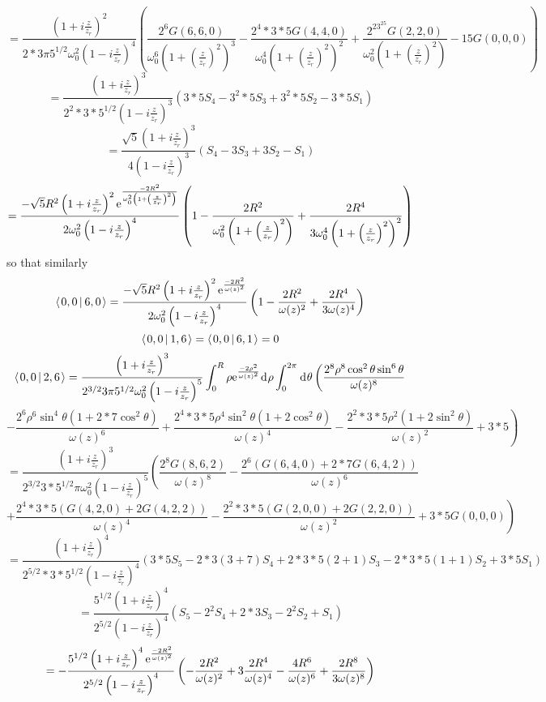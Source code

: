 \documentclass[11pt]{amsart}
\makeatletter
\newcommand{\e}{{\rm e}}				%
\newcommand{\msp}[1]{\mspace{#1mu}}		%
\newcommand{\0}{\varnothing}		%
\newcommand{\dd}{\msp{1} {\rm{d}} \msp{1}}	%
\newcommand{\brac}[2]{\left\langle\msp{2} #1\left\lvert \msp{3.5} #2 \right.\right\rangle}	%
\newcommand{\1}{!}
\newcommand{\2}{@}
\newcommand{\3}{\#}
\newcommand{\4}{\$}
\newcommand{\5}{\%}
\newcommand{\6}{$^\wedge$}
\newcommand{\7}{\&}
\newcommand{\8}{*}
\newcommand{\9}{(}
\makeatother
\begin{document}
\[
=\frac{\left(1+i\frac{z}{z_r}\right)^2}{2*3\pi5^{1/2}\omega_0^2\left(1-i\frac{z}{z_r}\right)^4}\left(\frac{2^6 G(6,6,0)}{\omega_0^6\left(1+\left(\frac{z}{z_r}\right)^2\right)^3}-\frac{2^4*3*5G(4,4,0)}{\omega_0^4\left(1+\left(\frac{z}{z_r}\right)^2\right)^2}+\frac{2^23^25G(2,2,0)}{\omega_0^2\left(1+\left(\frac{z}{z_r}\right)^2\right)}-15G(0,0,0)\right)
\]
\[
=\frac{\left(1+i\frac{z}{z_r}\right)^3}{2^2*3*5^{1/2}\left(1-i\frac{z}{z_r}\right)^3}\left(3*5S_4-3^2*5S_3+3^2*5S_2-3*5S_1\right)
\]
\[
=\frac{\sqrt{5}\left(1+i\frac{z}{z_r}\right)^3}{4\left(1-i\frac{z}{z_r}\right)^3}\left(S_4-3S_3+3S_2-S_1\right)
\]
\[
=\frac{-\sqrt{5}R^2\left(1+i\frac{z}{z_r}\right)^2\e^{\frac{-2R^2}{\omega_0^2\left(1+\left(\frac{z}{z_r}\right)^2\right)}}}{2\omega_0^2\left(1-i\frac{z}{z_r}\right)^4}\left(1-\frac{2R^2}{\omega_0^2\left(1+\left(\frac{z}{z_r}\right)^2\right)}+\frac{2R^4}{3\omega_0^4\left(1+\left(\frac{z}{z_r}\right)^2\right)^2}\right)
\]
so that similarly
\[
\brac{0,0}{6,0} = \frac{-\sqrt{5}R^2\left(1+i\frac{z}{z_r}\right)^2\e^{\frac{-2R^2}{\omega(z)^2}}}{2\omega_0^2\left(1-i\frac{z}{z_r}\right)^4}\left(1-\frac{2R^2}{\omega(z)^2}+\frac{2R^4}{3\omega(z)^4}\right)
\]
\[
\brac{0,0}{1,6} = \brac{0,0}{6,1} = 0
\]\newpage
\[
\brac{0,0}{2,6} = \frac{\left(1+i\frac{z}{z_r}\right)^3}{2^{3/2}3\pi5^{1/2}\omega_0^2\left(1-i\frac{z}{z_r}\right)^5}\int_0^R\rho \e^{\frac{-2\rho^2}{\omega(z)^2}}\dd \rho\int_0^{2\pi}\dd \theta\left(\frac{2^8\rho^8\cos^2\theta\sin^6\theta}{\omega(z)^8}\right.
\]
\[
\left.-\frac{2^6\rho^6\sin^4\theta\left(1+2*7\cos^2\theta\right)}{\omega(z)^6}+\frac{2^4*3*5\rho^4\sin^2\theta\left(1+2\cos^2\theta\right)}{\omega(z)^4}-\frac{2^2*3*5\rho^2\left(1+2\sin^2\theta\right)}{\omega(z)^2}+3*5\right)
\]
\[
= \frac{\left(1+i\frac{z}{z_r}\right)^3}{2^{3/2}3*5^{1/2}\pi\omega_0^2\left(1-i\frac{z}{z_r}\right)^5}\left(\frac{2^8G(8,6,2)}{\omega(z)^8}-\frac{2^6\left(G(6,4,0)+2*7G(6,4,2)\right)}{\omega(z)^6}\right.
\]
\[
\left.+\frac{2^4*3*5\left(G(4,2,0)+2G(4,2,2)\right)}{\omega(z)^4}-\frac{2^2*3*5\left(G(2,0,0)+2G(2,2,0)\right)}{\omega(z)^2}+3*5G(0,0,0)\right)
\]
\[
=\frac{\left(1+i\frac{z}{z_r}\right)^4}{2^{5/2}*3*5^{1/2}\left(1-i\frac{z}{z_r}\right)^4}\left(3*5S_5-2*3\left(3+7\right)S_4+2*3*5\left(2+1\right)S_3-2*3*5\left(1+1\right)S_2+3*5S_1\right)
\]
\[
=\frac{5^{1/2}\left(1+i\frac{z}{z_r}\right)^4}{2^{5/2}\left(1-i\frac{z}{z_r}\right)^4}\left(S_5-2^2S_4+2*3S_3-2^2S_2+S_1\right)
\]
\[
=-\frac{5^{1/2}\left(1+i\frac{z}{z_r}\right)^4\e^{\frac{-2R^2}{\omega(z)^2}}}{2^{5/2}\left(1-i\frac{z}{z_r}\right)^4}\left(-\frac{2R^2}{\omega(z)^2}+3\frac{2R^4}{\omega(z)^4}-\frac{4R^6}{\omega(z)^6}+\frac{2R^8}{3\omega(z)^8}\right)
\]
\end{document}
